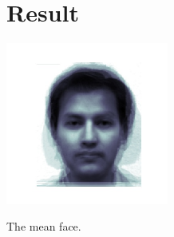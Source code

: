 \documentclass[letterpaper]{polythesis}
\begin{document}
\chapter{Result}
\label{ch-3}

\includegraphics[width=0.4\textwidth]{./image/mean.jpg}

The mean face.

\newpage
\end{document}

